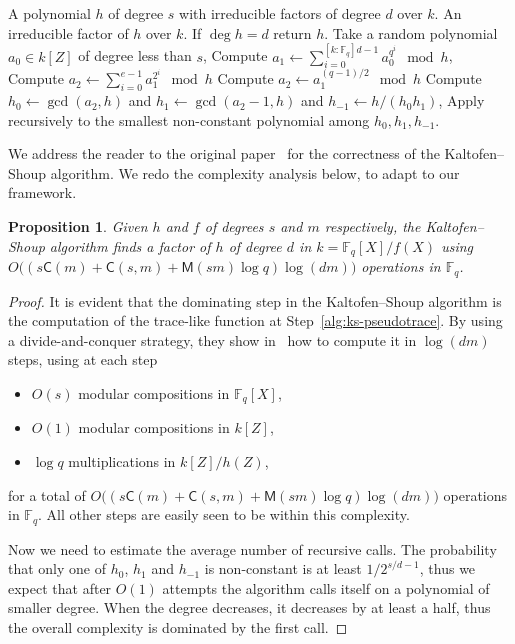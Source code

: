 \documentclass[12pt]{article}
\theoremstyle{plain}
\newtheorem{proposition}[theorem]{Proposition}
\theoremstyle{definition}
\def\F{\ensuremath{\mathbb{F}}}
\def\MM{\ensuremath{\mathsf{M}}}
\def\CC{\ensuremath{\mathsf{C}}}
\newcounter{algorithm}
\begin{document}
\begin{algorithm}
	\label{alg:ks}
	\begin{algorithmic}[1]
		\REQUIRE A polynomial $h$ of degree $s$ with irreducible factors of degree $d$ over $k$.
		\ENSURE An irreducible factor of $h$ over $k$.
		\STATE If $\deg h = d$ return $h$.
		\STATE Take a random polynomial $a_0\in k[Z]$ of degree less than $s$,
		\STATE\label{alg:ks-pseudotrace} Compute $\displaystyle a_1 
		\leftarrow \sum_{i=0}^{[k:\F_q]d-1} a_0^{q^i} \mod h$,
		\STATE\label{alg:ks:even} Compute $\displaystyle a_2 \leftarrow 
		\sum_{i=0}^{e-1} a_1^{2^i}\mod h$
		\ELSE
		\STATE\label{alg:ks:odd} Compute $a_2 \leftarrow a_1^{(q-1)/2}\mod h$
		\ENDIF
		\STATE\label{alg:ks:gcd} Compute $h_0\leftarrow\gcd(a_2,h)$ and 
		$h_1\leftarrow\gcd(a_2-1,h)$ and $h_{-1}\leftarrow h/(h_0h_1)$,
		\STATE Apply recursively to the smallest non-constant polynomial among 
		$h_0,h_1,h_{-1}$.
	\end{algorithmic}
\end{algorithm}

We address the reader to the original paper~\cite{kaltofen+shoup97}
for the correctness of the Kaltofen--Shoup algorithm. We redo the
complexity analysis below, to adapt to our framework.

\begin{proposition}
  Given $h$ and $f$ of degrees $s$ and $m$ respectively, the
  Kaltofen--Shoup algorithm finds a factor of $h$ of degree $d$ in
  $k=\F_q[X]/f(X)$ using
  $O\bigl((s\CC(m) + \CC(s,m) + \MM(sm)\log q)\log(dm)\bigr)$
  operations in $\F_q$.
\end{proposition}
\begin{proof}
	It is evident that the dominating step in the Kaltofen--Shoup
	algorithm is the computation of the trace-like function at
	Step~\ref{alg:ks-pseudotrace}. By using a divide-and-conquer
	strategy, they show in~\cite{kaltofen+shoup97} how to compute it in
	$\log (dm)$ steps, using at each step
	\begin{itemize}
		\item $O(s)$ modular compositions in $\F_q[X]$,
		\item $O(1)$ modular compositions in $k[Z]$,
		\item $\log q$ multiplications in $k[Z]/h(Z)$,
	\end{itemize}
	for a total of
        $O\bigl((s\CC(m) + \CC(s,m) + \MM(sm)\log q)\log(dm)\bigr)$
        operations in $\F_q$.  All other steps are easily seen to be
        within this complexity.
	
	Now we need to estimate the average number of recursive calls. The
	probability that only one of $h_0$, $h_1$ and $h_{-1}$ is
	non-constant is at least $1/2^{s/d-1}$, thus we expect that after
	$O(1)$ attempts the algorithm calls itself on a polynomial of
	smaller degree. When the degree decreases, it decreases by at least
	a half, thus the overall complexity is dominated by the first call.
\end{proof}
\end{document}
